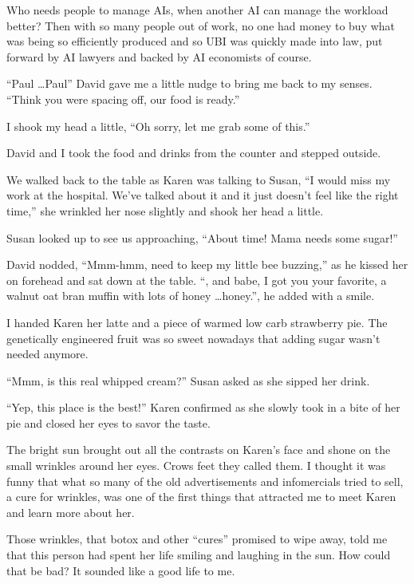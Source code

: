 Who needs people to manage AIs, when another AI can manage the
workload better? Then with so many people out of work, no one
had money to buy what was being so efficiently produced and so
UBI was quickly made into law, put forward by AI lawyers and
backed by AI economists of course.

\subsectsep

``Paul \ldots Paul'' David gave me a little nudge to bring me
back to my senses. ``Think you were spacing off, our food is
ready.''

I shook my head a little, ``Oh sorry, let me grab
some of this.''

David and I took the food and drinks from the counter and
stepped outside.

We walked back to the table as Karen was talking to Susan, ``I
would miss my work at the hospital. We've talked about it and it
just doesn't feel like the right time,'' she wrinkled her nose
slightly and shook her head a little.

Susan looked up to see us approaching, ``About time! Mama needs
some sugar!''

David nodded, ``Mmm-hmm, need to keep my little bee
buzzing,'' as he kissed her on forehead and sat down at the
table. ``, and babe, I got you your favorite, a walnut oat bran
muffin with lots of honey \ldots honey.'', he added with
a smile.

I handed Karen her latte and a piece of warmed low
carb strawberry pie. The genetically engineered fruit was so
sweet nowadays that adding sugar wasn't needed anymore.

``Mmm, is this real whipped cream?'' Susan asked as she
sipped her drink.

``Yep, this place is the best!'' Karen confirmed as she slowly
took in a bite of her pie and closed her eyes to savor the
taste.

The bright sun brought out all the contrasts on Karen's face and
shone on the small wrinkles around her eyes. Crows feet they
called them. I thought it was funny that what so many of the old
advertisements and infomercials tried to sell, a cure for
wrinkles, was one of the first things that attracted me to
meet Karen and learn more about her.

Those wrinkles, that botox and other ``cures'' promised to
wipe away, told me that this person had spent her life
smiling and laughing in the sun. How could that be bad?  It
sounded like a good life to me.

